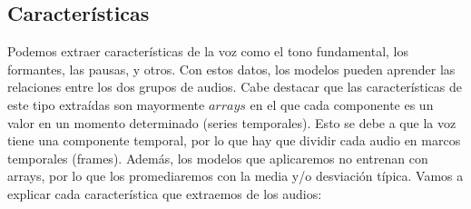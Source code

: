 \subsection*{Características}

Podemos extraer características de la voz como el tono fundamental, los formantes, las pausas, y otros. Con estos datos, los modelos pueden aprender las relaciones entre los dos grupos de audios. Cabe destacar que las características de este tipo extraídas son mayormente $arrays$ en el que cada componente es un valor en un momento determinado (series temporales). Esto se debe a que la voz tiene una componente temporal, por lo que hay que dividir cada audio en marcos temporales (frames). Además, los modelos que aplicaremos no entrenan con arrays, por lo que los promediaremos con la media y/o desviación típica. Vamos a explicar cada característica que extraemos de los audios:

